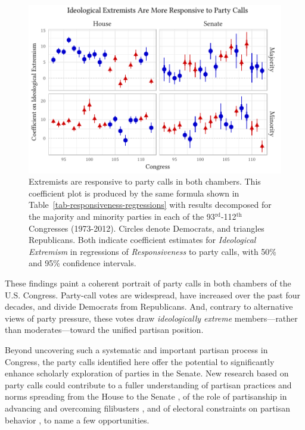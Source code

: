 \documentclass[12pt]{article}
\begin{document}
\begin{figure}[t]
\centering
\includegraphics{extremism-responsiveness.pdf}
\caption{
  Extremists are responsive to party calls in both chambers.
  This coefficient plot is produced by the same formula shown in
  Table~\ref{tab-responsiveness-regressions} with results decomposed for the
  majority and minority parties in each of the
  93$^{\text{rd}}$-112$^{\text{th}}$ Congresses (1973-2012).
  Circles denote Democrats, and triangles Republicans.
  Both indicate coefficient estimates for \textit{Ideological Extremism} in
  regressions of \textit{Responsiveness} to party calls, with 50\% and 95\%
  confidence intervals.
  \label{fig-extremism-responsiveness}}
\end{figure}

These findings paint a coherent portrait of party calls in both chambers of the
U.S. Congress.
Party-call votes are widespread, have increased over the past four decades, and
divide Democrats from Republicans.
And, contrary to alternative views of party pressure, these votes draw
\textit{ideologically extreme} members---rather than moderates---toward the
unified partisan position.

Beyond uncovering such a systematic and important partisan process in Congress,
the party calls identified here offer the potential to significantly enhance
scholarly exploration of parties in the Senate.
New research based on party calls could contribute to a fuller understanding of
partisan practices and norms spreading from the House to the Senate
\citep[e.g.,][]{Theriault:2013}, of the role of partisanship in advancing and
overcoming filibusters \citep[e.g.,][]{Wawro:2013}, and of electoral
constraints on partisan behavior \citep[e.g.,][]{Levitt:1996}, to name a few
opportunities.
\end{document}

